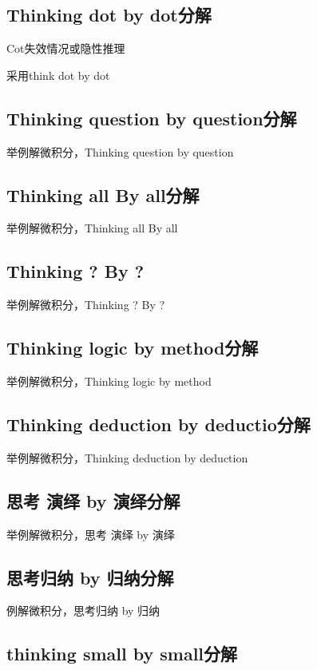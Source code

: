\documentclass[12pt]{book}
\begin{document}
\subsection{Thinking dot by dot分解}
Cot失效情况或隐性推理

采用think dot by dot

\subsection{Thinking question by question分解}

举例解微积分，Thinking question by question

\subsection{Thinking all By all分解}

举例解微积分，Thinking all By all


\subsection{Thinking ? By ?}

举例解微积分，Thinking ? By ?


\subsection{Thinking logic by method分解}

举例解微积分，Thinking logic by method


\subsection{Thinking deduction by deductio分解}

举例解微积分，Thinking deduction by deduction

\subsection{思考 演绎 by 演绎分解}
举例解微积分，思考 演绎 by 演绎


\subsection{思考归纳 by 归纳分解}

例解微积分，思考归纳 by 归纳


\subsection{thinking small by small分解}
\end{document}
